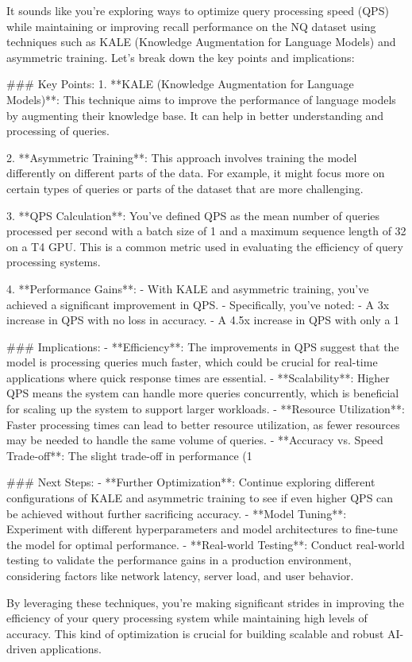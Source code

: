 It sounds like you're exploring ways to optimize query processing speed (QPS) while maintaining or improving recall performance on the NQ dataset using techniques such as KALE (Knowledge Augmentation for Language Models) and asymmetric training. Let's break down the key points and implications:

### Key Points:
1. **KALE (Knowledge Augmentation for Language Models)**: This technique aims to improve the performance of language models by augmenting their knowledge base. It can help in better understanding and processing of queries.

2. **Asymmetric Training**: This approach involves training the model differently on different parts of the data. For example, it might focus more on certain types of queries or parts of the dataset that are more challenging.

3. **QPS Calculation**: You've defined QPS as the mean number of queries processed per second with a batch size of 1 and a maximum sequence length of 32 on a T4 GPU. This is a common metric used in evaluating the efficiency of query processing systems.

4. **Performance Gains**:
   - With KALE and asymmetric training, you've achieved a significant improvement in QPS.
   - Specifically, you've noted:
     - A 3x increase in QPS with no loss in accuracy.
     - A 4.5x increase in QPS with only a 1%

### Implications:
- **Efficiency**: The improvements in QPS suggest that the model is processing queries much faster, which could be crucial for real-time applications where quick response times are essential.
- **Scalability**: Higher QPS means the system can handle more queries concurrently, which is beneficial for scaling up the system to support larger workloads.
- **Resource Utilization**: Faster processing times can lead to better resource utilization, as fewer resources may be needed to handle the same volume of queries.
- **Accuracy vs. Speed Trade-off**: The slight trade-off in performance (1%

### Next Steps:
- **Further Optimization**: Continue exploring different configurations of KALE and asymmetric training to see if even higher QPS can be achieved without further sacrificing accuracy.
- **Model Tuning**: Experiment with different hyperparameters and model architectures to fine-tune the model for optimal performance.
- **Real-world Testing**: Conduct real-world testing to validate the performance gains in a production environment, considering factors like network latency, server load, and user behavior.

By leveraging these techniques, you're making significant strides in improving the efficiency of your query processing system while maintaining high levels of accuracy. This kind of optimization is crucial for building scalable and robust AI-driven applications.